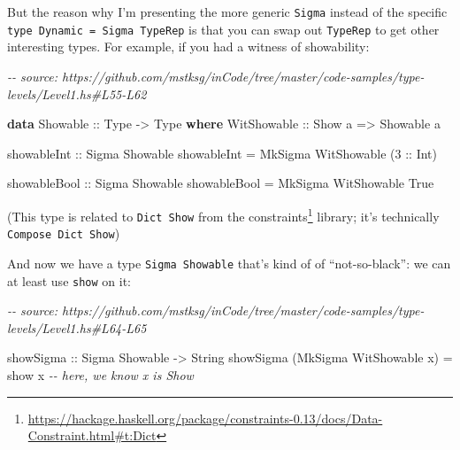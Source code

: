 \documentclass[]{article}
\newenvironment{Shaded}{}{}
\newcommand{\CommentTok}[1]{\textcolor[rgb]{0.38,0.63,0.69}{\textit{#1}}}
\newcommand{\DataTypeTok}[1]{\textcolor[rgb]{0.56,0.13,0.00}{#1}}
\newcommand{\DecValTok}[1]{\textcolor[rgb]{0.25,0.63,0.44}{#1}}
\newcommand{\FunctionTok}[1]{\textcolor[rgb]{0.02,0.16,0.49}{#1}}
\newcommand{\KeywordTok}[1]{\textcolor[rgb]{0.00,0.44,0.13}{\textbf{#1}}}
\newcommand{\NormalTok}[1]{#1}
\newcommand{\OtherTok}[1]{\textcolor[rgb]{0.00,0.44,0.13}{#1}}
\renewcommand{\href}[2]{#2\footnote{\url{#1}}}
\begin{document}
But the reason why I'm presenting the more generic \texttt{Sigma} instead of the
specific \texttt{type\ Dynamic\ =\ Sigma\ TypeRep} is that you can swap out
\texttt{TypeRep} to get other interesting types. For example, if you had a
witness of showability:

\begin{Shaded}
\begin{Highlighting}[]
\CommentTok{{-}{-} source: https://github.com/mstksg/inCode/tree/master/code{-}samples/type{-}levels/Level1.hs\#L55{-}L62}

\KeywordTok{data} \DataTypeTok{Showable}\OtherTok{ ::} \DataTypeTok{Type} \OtherTok{{-}\textgreater{}} \DataTypeTok{Type} \KeywordTok{where}
  \DataTypeTok{WitShowable}\OtherTok{ ::} \DataTypeTok{Show}\NormalTok{ a }\OtherTok{=\textgreater{}} \DataTypeTok{Showable}\NormalTok{ a}

\OtherTok{showableInt ::} \DataTypeTok{Sigma} \DataTypeTok{Showable}
\NormalTok{showableInt }\OtherTok{=} \DataTypeTok{MkSigma} \DataTypeTok{WitShowable}\NormalTok{ (}\DecValTok{3}\OtherTok{ ::} \DataTypeTok{Int}\NormalTok{)}

\OtherTok{showableBool ::} \DataTypeTok{Sigma} \DataTypeTok{Showable}
\NormalTok{showableBool }\OtherTok{=} \DataTypeTok{MkSigma} \DataTypeTok{WitShowable} \DataTypeTok{True}
\end{Highlighting}
\end{Shaded}

(This type is related to \texttt{Dict\ Show} from the
\href{https://hackage.haskell.org/package/constraints-0.13/docs/Data-Constraint.html\#t:Dict}{constraints}
library; it's technically \texttt{Compose\ Dict\ Show})

And now we have a type \texttt{Sigma\ Showable} that's kind of of
``not-so-black'': we can at least use \texttt{show} on it:

\begin{Shaded}
\begin{Highlighting}[]
\CommentTok{{-}{-} source: https://github.com/mstksg/inCode/tree/master/code{-}samples/type{-}levels/Level1.hs\#L64{-}L65}

\OtherTok{showSigma ::} \DataTypeTok{Sigma} \DataTypeTok{Showable} \OtherTok{{-}\textgreater{}} \DataTypeTok{String}
\NormalTok{showSigma (}\DataTypeTok{MkSigma} \DataTypeTok{WitShowable}\NormalTok{ x) }\OtherTok{=} \FunctionTok{show}\NormalTok{ x }\CommentTok{{-}{-} here, we know x is Show}
\end{Highlighting}
\end{Shaded}
\end{document}
